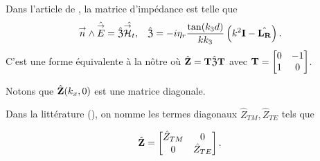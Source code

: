         Dans l'article de \cite{marceaux_high-order_2000}, la matrice d'impédance est telle que
        \begin{align*}
             {\overset{\rightarrow}{n}} \wedge \hat{{\overset{\rightarrow}{E}}} = \hat{\mathfrak{Z}} \hat{{\overset{\rightarrow}{\mathcal{H}}}_t}, && \hat{\mathfrak{Z}} = -i\eta_r\dfrac{\tan(k_3d)}{kk_3}\left(k^2\mathbf{I} - \hat{\mathbf{L_R}}\right).
        \end{align*}
        C'est une forme équivalente à la nôtre où \(\hat{\mathbf{Z}} = \mathbf{T}\hat{\mathfrak{Z}}\mathbf{T}\) avec \(\mathbf{T} = \begin{bmatrix}0&-1\\1&0\end{bmatrix}\).

        Notons que \(\hat{\mathbf{Z}}(k_x,0)\) est une matrice diagonale.
        
        Dans la littérature (\cite{stupfel_implementation_2015,aubakirov_electromagnetic_2014,hoppe_impedance_1995}), on nomme les termes diagonaux \(\hat Z_{TM}, \hat Z_{TE}\) tels que
        
        \begin{equation*}
            \hat {\mathbf{Z}} =
            \begin{bmatrix}
                \hat Z_{TM} & 0
                \\
                0 & \hat Z_{TE}
            \end{bmatrix}.
        \end{equation*}

